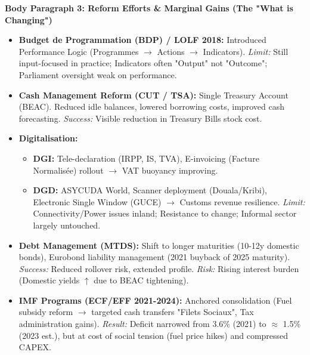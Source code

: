 \documentclass[11pt]{article}
\begin{document}
\begin{exoresolu}
\textbf{Body Paragraph 3: Reform Efforts \& Marginal Gains (The "What is Changing")} 
\begin{itemize}
    \item \textbf{Budget de Programmation (BDP) / LOLF 2018:} Introduced Performance Logic (Programmes $\rightarrow$ Actions $\rightarrow$ Indicators). \textit{Limit:} Still input-focused in practice; Indicators often "Output" not "Outcome"; Parliament oversight weak on performance.
    \item \textbf{Cash Management Reform (CUT / TSA):} Single Treasury Account (BEAC). Reduced idle balances, lowered borrowing costs, improved cash forecasting. \textit{Success:} Visible reduction in Treasury Bills stock cost.
    \item \textbf{Digitalisation:}\begin{itemize}
        \item \textbf{DGI:} Tele-declaration (IRPP, IS, TVA), E-invoicing (Facture Normalisée) rollout $\rightarrow$ VAT buoyancy improving.
        \item \textbf{DGD:} ASYCUDA World, Scanner deployment (Douala/Kribi), Electronic Single Window (GUCE) $\rightarrow$ Customs revenue resilience. \textit{Limit:} Connectivity/Power issues inland; Resistance to change; Informal sector largely untouched.
    \end{itemize}
    \item \textbf{Debt Management (MTDS):} Shift to longer maturities (10-12y domestic bonds), Eurobond liability management (2021 buyback of 2025 maturity). \textit{Success:} Reduced rollover risk, extended profile. \textit{Risk:} Rising interest burden (Domestic yields $\uparrow$ due to BEAC tightening).
    \item \textbf{IMF Programs (ECF/EFF 2021-2024):} Anchored consolidation (Fuel subsidy reform $\rightarrow$ targeted cash transfers "Filets Sociaux", Tax administration gains). \textit{Result:} Deficit narrowed from 3.6\% (2021) to $\approx$ 1.5\% (2023 est.), but at cost of social tension (fuel price hikes) and compressed CAPEX.
\end{itemize}


\end{exoresolu}
\end{document}
